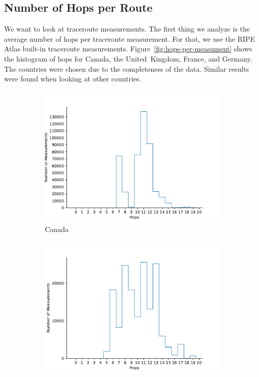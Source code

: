 \subsection{Number of Hops per Route}

We want to look at traceroute measurements. The first thing we analyze is the
average number of hops per traceroute measurement. For that, we use the RIPE
Atlas built-in traceroute measurements. Figure~\ref{fig:hops-per-measument}
shows the histogram of hops for Canada, the United~Kingdom, France, and
Germany. The countries were chosen due to the completeness of the data. Similar
results were found when looking at other countries.

\begin{figure}
	\centering
	\begin{subfigure}[b]{0.48\linewidth}
		\includegraphics[width=\linewidth]{chapters/4-results/traceroute/img/hops_CA.pdf}
		\caption{Canada}
	\end{subfigure}
	\begin{subfigure}[b]{0.48\linewidth}
		\includegraphics[width=\linewidth]{chapters/4-results/traceroute/img/hops_PH.pdf}

\end{subfigure}
\end{figure}
